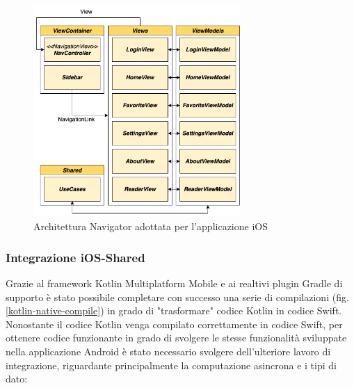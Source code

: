\begin{figure}[H]
\centering
    \includegraphics[width=0.7\textwidth]{img/navigator-arch-ios.png}
    \caption{Architettura Navigator adottata per l'applicazione iOS}
    \label{iosarchapp}
\end{figure}

\subsubsection*{Integrazione iOS-Shared}
\label{integrazione-ios-shared}
Grazie al framework Kotlin Multiplatform Mobile e ai realtivi plugin Gradle di supporto è stato possibile completare con successo una serie di compilazioni (fig. \ref{kotlin-native-compile}) in grado di "trasformare" codice Kotlin in codice Swift. Nonostante il codice Kotlin venga compilato correttamente in codice Swift, per ottenere codice funzionante in grado di svolgere le stesse funzionalità sviluppate nella applicazione Android è stato necessario svolgere dell'ulteriore lavoro di integrazione, riguardante principalmente la computazione asincrona e i tipi di dato:


